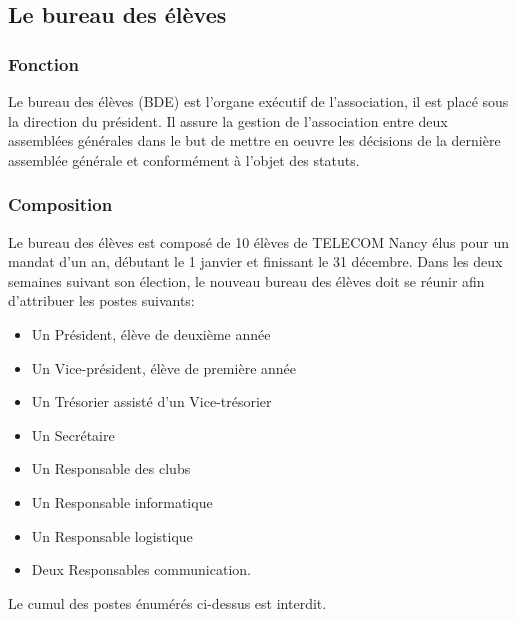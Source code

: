 \documentclass{article}
\begin{document}
		\subsection{Le bureau des élèves}
\label{sub:le_bureau_des_eleves}
			\subsubsection{Fonction}
\label{ssub:fonction}
			
				Le bureau des élèves (BDE) est l'organe exécutif de
				l'association, il est placé sous la direction du président. Il
				assure la gestion de l'association entre deux assemblées
				générales dans le but de mettre en oeuvre les décisions de la
				dernière assemblée générale et conformément à l'objet des
				statuts.

			\subsubsection{Composition}
\label{ssub:composition}
			
				Le bureau des élèves est composé de 10 élèves de TELECOM Nancy
				élus pour un mandat d’un an, débutant le 1 janvier et
				finissant le 31 décembre. Dans les deux semaines suivant son
				élection, le nouveau bureau des élèves doit se réunir afin
				d'attribuer les postes suivants:
				\begin{itemize}
					\item Un Président, élève de deuxième année
					\item Un Vice-président, élève de première année
					\item Un Trésorier assisté d’un Vice-trésorier
					\item Un Secrétaire
					\item Un Responsable des clubs
					\item Un Responsable informatique
					\item Un Responsable logistique
					\item Deux Responsables communication.
				\end{itemize}

				Le cumul des postes énumérés ci-dessus est interdit.
\end{document}
